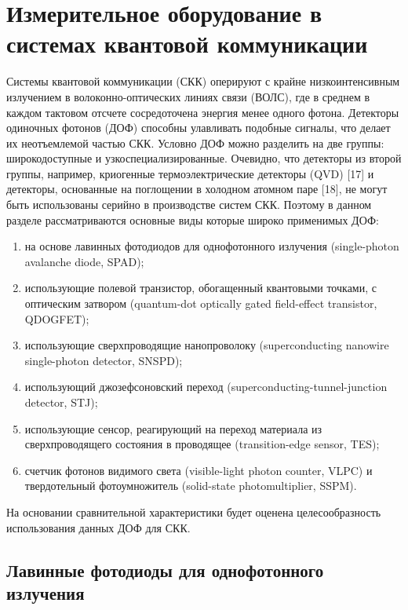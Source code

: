 
\section{Измерительное оборудование в системах квантовой коммуникации} \label{sec:ch1/sec5}


Системы квантовой коммуникации (СКК) оперируют с крайне низкоинтенсивным излучением в волоконно-оптических линиях связи (ВОЛС), где в среднем в каждом тактовом отсчете сосредоточена энергия менее одного фотона. Детекторы одиночных фотонов (ДОФ) способны улавливать подобные сигналы, что делает их неотъемлемой частью СКК. Условно ДОФ можно разделить на две группы: широкодоступные и узкоспециализированные. Очевидно, что детекторы из второй группы, например, криогенные термоэлектрические детекторы (QVD) [17] и детекторы, основанные на поглощении в холодном атомном паре [18], не могут быть использованы серийно в производстве систем СКК. Поэтому в данном разделе рассматриваются основные виды которые широко применимых ДОФ:

\begin{enumerate}
	\item на основе лавинных фотодиодов для однофотонного излучения (single-photon avalanche diode, SPAD);
	\item использующие полевой транзистор, обогащенный квантовыми точками, с оптическим затвором (quantum-dot optically gated field-effect transistor, QDOGFET);
	\item использующие сверхпроводящие нанопроволоку (superconducting nanowire single-photon detector, SNSPD);
	\item использующий джозефсоновский переход (superconducting-tunnel-junction detector, STJ);
	\item использующие сенсор, реагирующий на переход материала из сверхпроводящего состояния в проводящее (transition-edge sensor, TES);
	\item счетчик фотонов видимого света (visible-light photon counter, VLPC) и твердотельный фотоумножитель (solid-state photomultiplier, SSPM).
\end{enumerate}

На основании сравнительной характеристики будет оценена целесообразность использования данных ДОФ для СКК.

\subsection{Лавинные фотодиоды для однофотонного излучения} \label{subsec:ch1/sec5/sub1}

